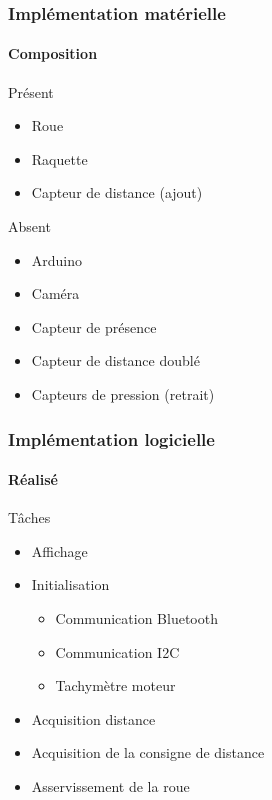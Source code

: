 \documentclass{beamer}
\begin{document}
  \begin{frame}
    \frametitle{Implémentation matérielle}
    \framesubtitle{Composition}

    Présent
    \begin{itemize}
      \item Roue
      \item Raquette
      \item Capteur de distance (ajout)
    \end{itemize} \vspace{1em}

    Absent
    \begin{itemize}
      \item Arduino
      \item Caméra
      \item Capteur de présence
      \item Capteur de distance doublé
      \item Capteurs de pression (retrait)
    \end{itemize}
  \end{frame}


  \begin{frame}
    \frametitle{Implémentation logicielle}
    \framesubtitle{Réalisé}

    Tâches
    \begin{itemize}
      \item Affichage
      \item Initialisation
      \begin{itemize}
        \item Communication Bluetooth
        \item Communication I2C
        \item Tachymètre moteur
      \end{itemize}
      \item Acquisition distance
      \item Acquisition de la consigne de distance
      \item Asservissement de la roue
    \end{itemize}
  \end{frame}
\end{document}
